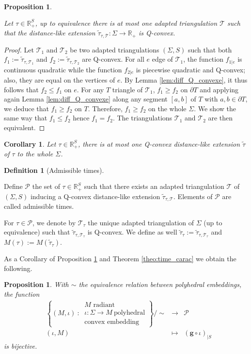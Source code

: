 \documentclass[a4paper,12pt]{article}
\def\TT{\mathcal T}
\def\adm{\P}
\def\RR{\mathbb{R}}
\def\quadform{\mathbf{g}}
\def\adm{\mathcal{P}}
\def\P{\mathcal{P}}
\newcommand{\functionn}[4]{\displaystyle\begin{array}{l|rcl}
& \displaystyle #1 & \longrightarrow & \displaystyle #2 \\
	& \displaystyle #3 & \longmapsto & \displaystyle #4 \end{array}}
\newcommand{\tautilde}[2]{\widetilde\tau_{#1,#2}}
\newtheorem{prop}[lem]{Proposition}
\newtheorem{cor}[lem]{Corollary}
\theoremstyle{definition}
\newtheorem{defi}[lem]{Definition}	%
\begin{document}
					\begin{prop} \label{prop:unique_Q_convexe}

					Let $\tau\in \RR_+^{S}$, up to equivalence there is at most one adapted triangulation $\TT$ 
						such that the distance-like extension $\tautilde{\tau}{\TT}: \Sigma\rightarrow \RR_+$ is Q-convex.
					\end{prop}
					\begin{proof}
					 Let $\TT_1$ and $\TT_2$ be two adapted triangulations $(\Sigma, S)$ such that both $f_1:=\tautilde{\tau}{\TT_1}$
					 and $f_2:=\tautilde{\tau}{\TT_2}$ are Q-convex.
					 For all $e$ edge of $\TT_1$, the function $f_{1|e}$ is continuous quadratic while
					 the function $f_{2|e}$ is piecewise quadratic and Q-convex; also, they are equal on the vertices of $e$.
					 By Lemma \ref{lem:diff_Q_convexe}, it thus follows that $f_2\leq f_1$ on $e$.
					 For any $T$ triangle of $\TT_1$, $f_1\geq f_2$ on $\partial T$ and applying again Lemma \ref{lem:diff_Q_convexe}
					 along any segment $[a,b]$ of $T$ with $a,b\in \partial T$, we deduce that $f_1\geq f_2$ on $T$. Therefore, $f_1\geq f_2$ on the whole $\Sigma$. We show the same way that $f_1\leq f_2$ hence $f_1=f_2$. The triangulations $\TT_1$ and $\TT_2$ are then equivalent.\end{proof}
					\begin{cor}\label{cor:most_one_q_convex_distance_like}
					 Let $\tau\in \RR_+^{S}$, there is at most one Q-convex distance-like extension $\widetilde\tau$ of $\tau$ to the whole $\Sigma$.
					\end{cor}

					\begin{defi}[Admissible times] \label{defi:temps_admissbles}

						Define $\adm$ the set of $\tau\in \RR_+^{S}$ such that there exists an adapted triangulation $\TT$ of $(\Sigma, S)$ inducing a Q-convex distance-like extension $\tautilde{\tau}{\TT}$. Elements of $\adm$ are called admissible times.

						For $\tau \in \adm$, we denote by $\TT_\tau$ the unique adapted triangulation of 
						 $\Sigma$ (up to equivalence) such that $\tautilde{\tau}{\TT_\tau}$ is Q-convex. We define as well $\widetilde\tau_\tau:= \tautilde{\tau}{\TT_\tau}$ and $M(\tau):=M(\widetilde\tau_\tau)$.

					\end{defi}
					As a Corollary of Proposition \ref{prop:unique_Q_convexe} and Theorem \ref{theo:time_carac} we obtain the following.
					\begin{prop}\label{prop:plong_conv} With $\sim$ the equivalence relation between polyhedral embeddings, the function
					 $$ \functionn{ \left\{(M,\iota) ~:~ \begin{array}{c}M \text{ radiant}\\
												 \iota:\Sigma\rightarrow M ~\text{polyhedral} \\ \text{convex embedding} 
												 \end{array}
\right\}/\sim }{\adm}{(\iota,M)}{\left(\quadform\circ \iota\right)_{|S} }$$
					 is bijective.
					\end{prop}
\end{document}
